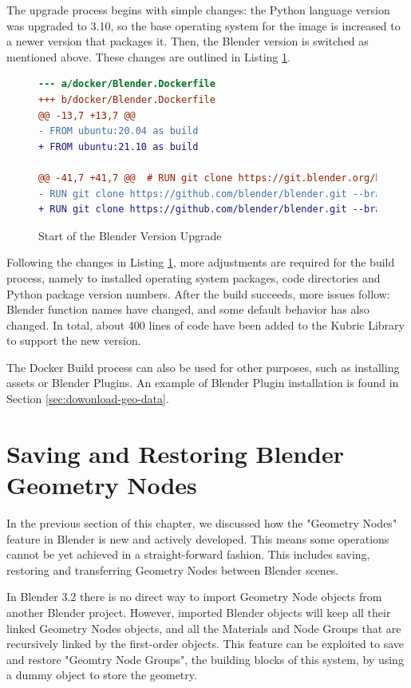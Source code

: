 The upgrade process begins with simple changes: the Python language version was upgraded to 3.10, so the base operating system for the image is increased to a newer version that packages it. Then, the Blender version is switched as mentioned above. These changes are outlined in Listing \ref{fig:idocker-build-diff}.

\begin{figure}[H]
\begin{lstlisting}[language=diff]
--- a/docker/Blender.Dockerfile
+++ b/docker/Blender.Dockerfile
@@ -13,7 +13,7 @@
- FROM ubuntu:20.04 as build
+ FROM ubuntu:21.10 as build

@@ -41,7 +41,7 @@  # RUN git clone https://git.blender.org/blender.git
- RUN git clone https://github.com/blender/blender.git --branch blender-v2.93-release --depth 1
+ RUN git clone https://github.com/blender/blender.git --branch blender-v3.2-release --depth 1 blender
\end{lstlisting}
\caption{Start of the Blender Version Upgrade }
\label{fig:idocker-build-diff}
\end{figure}

Following the changes in Listing \ref{fig:idocker-build-diff}, more adjustments are required for the build process, namely to installed operating system packages, code directories and Python package version numbers. After the build succeeds, more issues follow: Blender function names have changed, and some default behavior has also changed. In total, about 400 lines of code have been added to the Kubric Library to support the new version.

The Docker Build process can also be used for other purposes, such as installing assets or Blender Plugins. An example of Blender Plugin installation is found in Section \ref{sec:dowonload-geo-data}.


\section{Saving and Restoring Blender Geometry Nodes}
\label{sec:save-restore-blender-geometry}

In the previous section of this chapter, we discussed how the "Geometry Nodes" feature in Blender is new and actively developed. This means some operations cannot be yet achieved in a straight-forward fashion. This includes saving, restoring and transferring Geometry Nodes between Blender scenes.

In Blender 3.2 there is no direct way to import Geometry Node objects from another Blender project. However, imported Blender objects will keep all their linked Geometry Nodes objects, and all the Materials and Node Groups that are recursively linked by the first-order objects. This feature can be exploited to save and restore "Geomtry Node Groups", the building blocks of this system, by using a dummy object to store the geometry.

